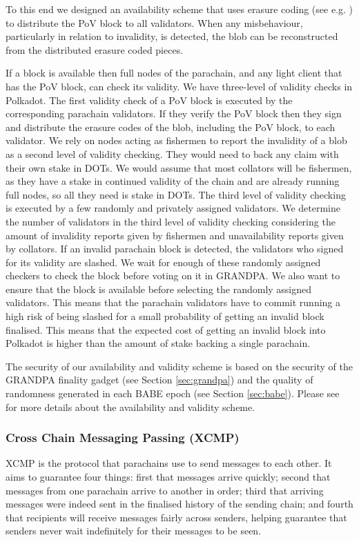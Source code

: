 To this end we designed an availability scheme that uses erasure coding (see e.g. \cite{availabilityETH2}) to distribute the PoV block to all validators.
When any misbehaviour, particularly in relation to invalidity, is detected, the blob can be reconstructed from the distributed erasure coded pieces.

If a block is available then full nodes of the parachain, and any light client that has the PoV block, can check its validity. We have three-level of validity checks in Polkadot. The first validity check of a PoV block is executed by the corresponding parachain validators. If they verify the PoV block then they sign and distribute the erasure codes of the blob, including the PoV block, to each validator.
We rely on nodes acting as fishermen to report the invalidity of a blob as  a second level of validity checking. They would need to back any claim with their own stake in DOTs. We would assume that most collators will be fishermen, as they have a stake in continued validity of the chain and are already running full nodes, so all they need is stake in DOTs. The third level of validity checking is executed by a few randomly and privately assigned validators. We determine the number of validators in the third level of validity checking considering the amount of invalidity reports given by fishermen and unavailability reports given by  collators. If an invalid parachain block is detected, the validators who signed for its validity are slashed.
We wait for enough of these randomly assigned checkers to check the block before voting on it in GRANDPA. We also  want to ensure that the block is available before selecting the randomly assigned validators. This means that the parachain validators have to commit running a high risk of being slashed for a small probability of getting an invalid block finalised. This means that the expected cost of getting an invalid block into Polkadot is higher than the amount of stake backing a single parachain.

The security of our availability and validity scheme is based on the security of the GRANDPA finality gadget (see Section \ref{sec:grandpa}) and the quality of randomness generated in each BABE epoch (see Section \ref{sec:babe}). Please see \cite{availandvalid} for more details about the availability and validity scheme.


\subsubsection{Cross Chain Messaging Passing (XCMP)} \label{sec:XCMP}
XCMP is the protocol that parachains use to send messages to each other.
It aims to guarantee four things: first that messages arrive quickly; second that messages from one parachain arrive to another in order; third that arriving messages were indeed sent in the finalised history of the sending chain; and fourth that recipients will receive messages fairly across senders, helping guarantee that senders never wait indefinitely for their messages to be seen.



